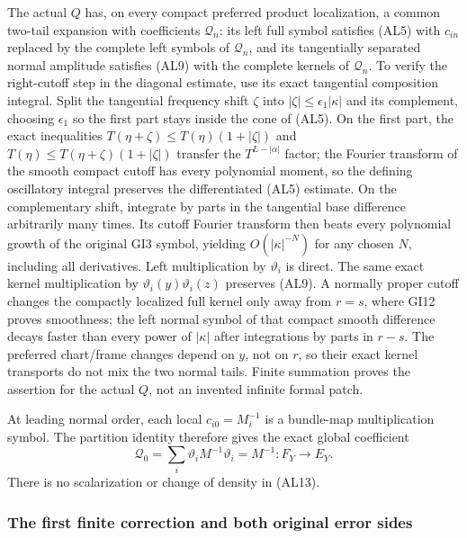 \documentclass[
  11pt,
]{article}
\begin{document}
The actual \(Q\) has, on every compact preferred product localization, a
common two-tail expansion with coefficients \(\mathcal Q_n\): its left
full symbol satisfies (AL5) with \(c_{in}\) replaced by the complete
left symbols of \(\mathcal Q_n\), and its tangentially separated normal
amplitude satisfies (AL9) with the complete kernels of \(\mathcal Q_n\).
To verify the right-cutoff step in the diagonal estimate, use its exact
tangential composition integral. Split the tangential frequency shift
\(\zeta\) into \(|\zeta|\leq\epsilon_1|\kappa|\) and its complement,
choosing \(\epsilon_1\) so the first part stays inside the cone of
(AL5). On the first part, the exact inequalities
\(T(\eta+\zeta)\leq T(\eta)(1+|\zeta|)\) and
\(T(\eta)\leq T(\eta+\zeta)(1+|\zeta|)\) transfer the \(T^{L-|\alpha|}\)
factor; the Fourier transform of the smooth compact cutoff has every
polynomial moment, so the defining oscillatory integral preserves the
differentiated (AL5) estimate. On the complementary shift, integrate by
parts in the tangential base difference arbitrarily many times. Its
cutoff Fourier transform then beats every polynomial growth of the
original GI3 symbol, yielding \(O(|\kappa|^{-N})\) for any chosen \(N\),
including all derivatives. Left multiplication by \(\vartheta_i\) is
direct. The same exact kernel multiplication by
\(\vartheta_i(y)\vartheta_i(z)\) preserves (AL9). A normally proper
cutoff changes the compactly localized full kernel only away from
\(r=s\), where GI12 proves smoothness; the left normal symbol of that
compact smooth difference decays faster than every power of \(|\kappa|\)
after integrations by parts in \(r-s\). The preferred chart/frame
changes depend on \(y\), not on \(r\), so their exact kernel transports
do not mix the two normal tails. Finite summation proves the assertion
for the actual \(Q\), not an invented infinite formal patch.

At leading normal order, each local \(c_{i0}=M_i^{-1}\) is a bundle-map
multiplication symbol. The partition identity therefore gives the exact
global coefficient \[
 \mathcal Q_0=\sum_i\vartheta_iM^{-1}\vartheta_i
 =M^{-1}:F_Y\longrightarrow E_Y.
 \tag{AL13}
\] There is no scalarization or change of density in (AL13).

\subsubsection{The first finite correction and both original error
sides}\label{the-first-finite-correction-and-both-original-error-sides}
\end{document}
